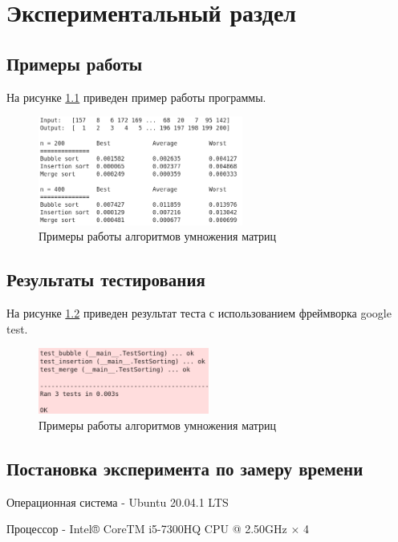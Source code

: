 \chapter{Экспериментальный раздел}
\label{cha:research}

\section{Примеры работы}
На рисунке \ref{fig:4.1} приведен пример работы программы.

\begin{figure}[h]
    \centering
    \includegraphics[width=0.6\textwidth]{3/inc/e1.png}
    \caption{Примеры работы алгоритмов умножения матриц}
    \label{fig:4.1}
\end{figure}


\section{Результаты тестирования}

На рисунке \ref{fig:4.2} приведен результат теста с использованием фреймворка google test.

\begin{figure}[h]
    \centering
    \includegraphics[width=0.5\textwidth]{3/inc/test.png}
    \caption{Примеры работы алгоритмов умножения матриц}
    \label{fig:4.2}
\end{figure}


\section{Постановка эксперимента по замеру времени}

Операционная система - Ubuntu 20.04.1 LTS

Процессор - Intel® CoreTM i5-7300HQ CPU @ 2.50GHz × 4

